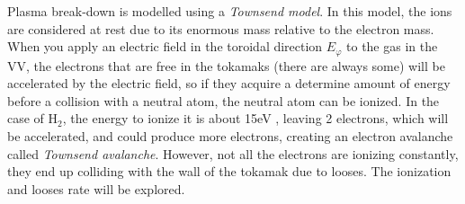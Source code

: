 \documentclass[a4paper,12pt,oneside]{book}
\begin{document}
Plasma break-down is modelled using a \textit{Townsend model}. In this model, the ions are considered at rest due to its enormous mass relative to the electron mass. When you apply an electric field in the toroidal direction $E_\varphi$ to the gas in the VV, the electrons that are free in the tokamaks (there are always some) will be accelerated by the electric field, so if they acquire a determine amount of energy before a collision with a neutral atom, the neutral atom can be ionized. In the case of H$_2$, the energy to ionize it is about 15eV \cite{ITER_2019}, leaving 2 electrons, which will be accelerated, and could produce more electrons, creating an electron avalanche called \textit{Townsend avalanche}. However, not all the electrons are ionizing constantly, they end up colliding with the wall of the tokamak due to looses. The ionization and looses rate will be explored.
%
\end{document}
